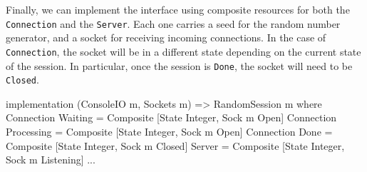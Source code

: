 Finally, we can implement the interface using composite resources for both
the \texttt{Connection} and the \texttt{Server}. Each one carries a seed
for the random number generator, and a socket for receiving incoming
connections. In the case of \texttt{Connection}, the socket will be in a
different state depending on the current state of the session. In
particular, once the session is \texttt{Done}, the socket will need to be
\texttt{Closed}.

\small
\begin{code}
implementation (ConsoleIO m, Sockets m) => RandomSession m where
  Connection Waiting = Composite [State Integer, Sock {m} Open]
  Connection Processing = Composite [State Integer, Sock {m} Open]
  Connection Done = Composite [State Integer, Sock {m} Closed]
  Server = Composite [State Integer, Sock {m} Listening]
  ...
\end{code}
\normalsize

